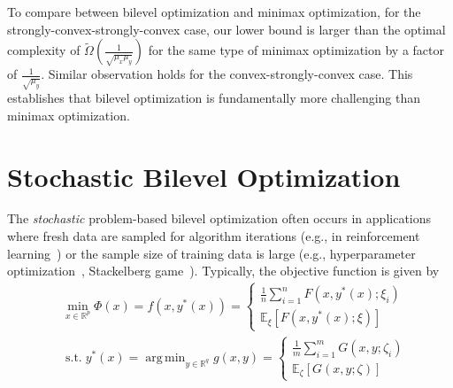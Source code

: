 \documentclass{osudissert96}
\DeclareMathOperator*{\argmin}{arg\,min}
\begin{document}
To compare between bilevel optimization and minimax optimization, for the strongly-convex-strongly-convex case, our lower bound is larger than the optimal complexity of {\small$\widetilde{\Omega}(\frac{1}{\sqrt{\mu_x\mu_y}})$} for the same type of minimax optimization by a factor of $\frac{1}{\sqrt{\mu_y}}$. Similar observation holds for the convex-strongly-convex case. This establishes that bilevel optimization is fundamentally more challenging than minimax optimization.   

\section{Stochastic Bilevel Optimization}
The {\em stochastic} problem-based bilevel optimization often occurs    
in  applications where fresh data are sampled for algorithm iterations (e.g., in reinforcement learning~\cite{hong2020two}) or the sample size of training data is large (e.g., hyperparameter optimization~\cite{franceschi2018bilevel}, Stackelberg game~\cite{roth2016watch}). Typically, the  objective function is given by 
\begin{align}\label{objective}
&\min_{x\in\mathbb{R}^{p}} \Phi(x)=f(x, y^*(x))= 
\begin{cases}
\frac{1}{n}{\sum_{i=1}^nF(x,y^*(x);\xi_i) } \\
\mathbb{E}_{\xi} \left[F(x,y^*(x);\xi)\right] 
\end{cases}\nonumber\\
& \;\mbox{s.t.} \;y^*(x)= \argmin_{y\in\mathbb{R}^q} g(x,y)=
\begin{cases}
\frac{1}{m}{\sum_{i=1}^{m} G(x,y;\zeta_i)} \\
\mathbb{E}_{\zeta} \left[G(x,y;\zeta)\right]
\end{cases}
\end{align}
\end{document}
